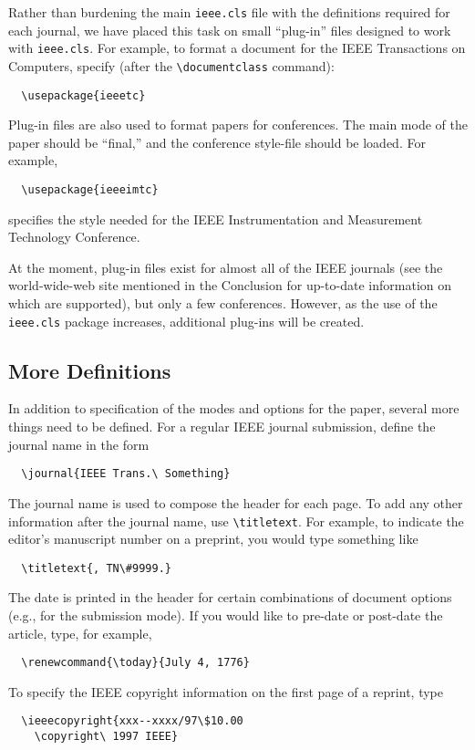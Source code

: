 \documentclass[%
	final,
	reprint,
	notitlepage,
	narroweqnarray,
	inline,
	twoside,
        invited,
	]{ieee}
\begin{document}
Rather than burdening the main \texttt{ieee.cls} file with the
definitions required for each journal, we have placed this task on
small ``plug-in'' files designed to work with \texttt{ieee.cls}. For
example, to format a document for the IEEE Transactions on Computers,
specify (after the \verb|\documentclass| command):
\begin{verbatim}
  \usepackage{ieeetc}
\end{verbatim}
Plug-in files are also used to format papers for conferences. The 
main mode of the paper should be ``final,'' and the 
conference style-file should be loaded. For example,
\begin{verbatim}
  \usepackage{ieeeimtc}
\end{verbatim}
specifies the style needed for the IEEE Instrumentation and
Measurement Technology Conference.

At the moment, plug-in files exist for almost all of the IEEE journals
(see the world-wide-web site mentioned in the Conclusion for
up-to-date information on which are supported), but only a few
conferences.  However, as the use of the \texttt{ieee.cls} package
increases, additional plug-ins will be created.

\subsection{More Definitions}

In addition to specification of the modes and options for the paper,
several more things need to be defined. For a regular IEEE journal
submission, define the journal name in the form
\begin{verbatim}
  \journal{IEEE Trans.\ Something}
\end{verbatim}
The journal name is used to compose the header for each page.  To add
any other information after the journal name, use \verb|\titletext|.
For example, to indicate the editor's manuscript number on a preprint,
you would type something like
\begin{verbatim}
  \titletext{, TN\#9999.}
\end{verbatim}

The date is printed in the header for certain combinations of document
options (e.g., for the submission mode). If you would like to pre-date
or post-date the article, type, for example,
\begin{verbatim}
  \renewcommand{\today}{July 4, 1776}
\end{verbatim}
To specify the IEEE copyright information on the first page of a
reprint, type
\begin{verbatim}
  \ieeecopyright{xxx--xxxx/97\$10.00 
    \copyright\ 1997 IEEE}
\end{verbatim}
\end{document}
